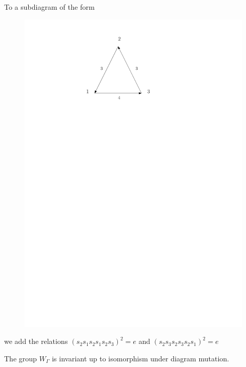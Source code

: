 \documentclass{beamer}
\begin{document}
\begin{frame}
To a subdiagram of the form
\begin{figure}
\includegraphics[scale = .50]{Diagram5.pdf}
\end{figure}
we add the relations $(s_{2}s_{1}s_{2}s_{1}s_{2}s_{3})^{2} = e$ and $(s_{2}s_{3}s_{2}s_{3}s_{2}s_{1})^{2} = e$
\end{frame}

\begin{frame}
\begin{theorem}
The group $W_{\Gamma}$ is invariant up to isomorphism under diagram mutation.
\end{theorem}
\end{frame}
\end{document}
